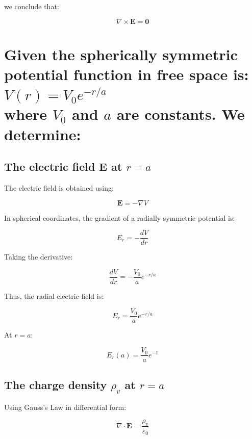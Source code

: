\documentclass[a4paper,12pt]{article}
\begin{document}
we conclude that:

\begin{equation}
\boxed{\nabla \times \mathbf{E} = \mathbf{0}}
\end{equation}

\section{Given the spherically symmetric potential function in free space is: \\ $V(r) = V_0 e^{-r/a} $ \\ where \( V_0 \) and \( a \) are constants. We determine:}

\subsection{The electric field \( \mathbf{E} \) at \( r = a \)}
The electric field is obtained using:

\begin{equation}
\mathbf{E} = -\nabla V
\end{equation}

In spherical coordinates, the gradient of a radially symmetric potential is:

\begin{equation}
E_r = -\frac{dV}{dr}
\end{equation}

Taking the derivative:

\begin{equation}
\frac{dV}{dr} = -\frac{V_0}{a} e^{-r/a}
\end{equation}

Thus, the radial electric field is:

\begin{equation}
\boxed{E_r = \frac{V_0}{a} e^{-r/a}}
\end{equation}

At \( r = a \):

\begin{equation}
\boxed{E_r(a) = \frac{V_0}{a} e^{-1}}
\end{equation}

\subsection{The charge density \( \rho_v \) at \( r = a \)}
Using Gauss’s Law in differential form:

\begin{equation}
\nabla \cdot \mathbf{E} = \frac{\rho_v}{\varepsilon_0}
\end{equation}
\end{document}
